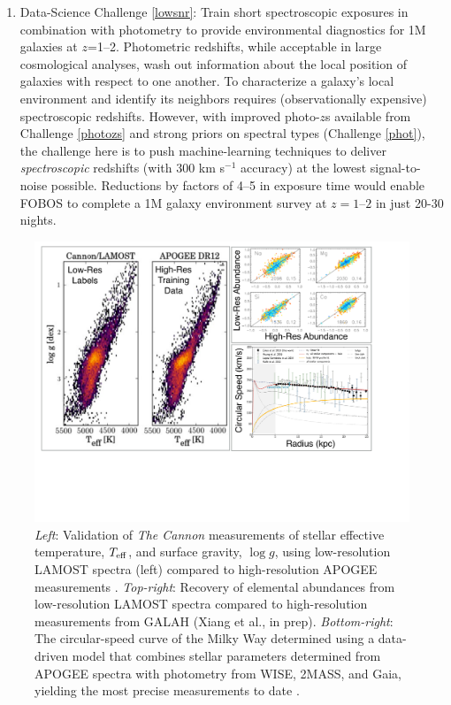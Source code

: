 

\begin{enumerate}[rightmargin=0.2cm,leftmargin=0.2cm]
%
%
\item[] {\textsf {\large Data-Science Challenge \ref{lowsnr}: Train
short spectroscopic exposures in combination with photometry to provide
environmental diagnostics for 1M galaxies at $z$=1--2}}.  Photometric
redshifts, while acceptable in large cosmological analyses, wash out
information about the local position of galaxies with respect to one
another.  To characterize a galaxy's local environment and identify its
neighbors requires (observationally expensive) spectroscopic redshifts.  However, with improved photo-$z$s available
from Challenge \ref{photozs} and strong priors on spectral types
(Challenge \ref{phot}), the challenge here is to push machine-learning techniques to deliver
\emph{spectroscopic} redshifts (with 300 km s$^{-1}$ accuracy) at the lowest signal-to-noise possible.  Reductions by
factors of 4--5 in exposure time would enable FOBOS to complete a 1M galaxy environment survey at $z=1$--$2$ in just
20-30 nights.

\end{enumerate}

\begin{figure}[h!]
%
\vskip -0.1in
%
\includegraphics[width=\textwidth]{figs/LGplots.pdf}
%
\caption{{\it Left}: Validation of {\it The Cannon} measurements of
stellar effective temperature, $T_{\rm eff}$, and surface gravity, $\log
g$, using low-resolution LAMOST spectra (left) compared to
high-resolution APOGEE measurements
\citep[right;][]{2017ApJ...836....5H}. {\it Top-right}: Recovery of
elemental abundances from low-resolution LAMOST spectra compared to
high-resolution measurements from GALAH (Xiang et al., in prep).  {\it
Bottom-right}: The circular-speed curve of the Milky Way determined
using a data-driven model that combines stellar parameters determined
from APOGEE spectra with photometry from WISE, 2MASS, and Gaia, yielding
the most precise measurements to date \citep{2019ApJ...871..120E}.}
%
\label{fig:Cannon}
%
\end{figure}
